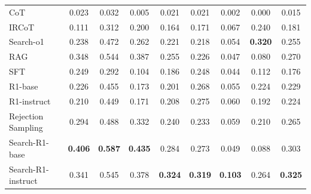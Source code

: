 \begin{table}[t]
\begin{tabular}{lcccccccc}
        CoT & 0.023 & 0.032 & 0.005 & 0.021 & 0.021 & 0.002 & 0.000 & 0.015 \\
        IRCoT & 0.111 & 0.312 & 0.200 & 0.164 & 0.171 & 0.067 & 0.240 & 0.181 \\
        Search-o1 & 0.238 & 0.472 & 0.262 & 0.221 & 0.218 & 0.054 & \textbf{0.320} & 0.255 \\
        RAG & 0.348 & 0.544 & 0.387 & 0.255 & 0.226 & 0.047 & 0.080 & 0.270  \\
        SFT & 0.249 & 0.292 & 0.104 & 0.186 & 0.248 & 0.044 & 0.112 & 0.176  \\
        R1-base & 0.226 & 0.455 & 0.173 & 0.201 & 0.268 & 0.055 & 0.224 & 0.229  \\
        R1-instruct & 0.210 & 0.449 & 0.171 & 0.208 & 0.275 & 0.060 & 0.192 & 0.224  \\
        Rejection Sampling & 0.294 & 0.488 & 0.332 & 0.240 & 0.233 & 0.059 & 0.210 & 0.265 \\
        \hdashline
        Search-R1-base & \textbf{0.406} & \textbf{0.587} & \textbf{0.435} & 0.284 & 0.273 & 0.049 & 0.088 & 0.303  \\
        Search-R1-instruct & 0.341 & 0.545 & 0.378 & \textbf{0.324} & \textbf{0.319} & \textbf{0.103} & 0.264 & \textbf{0.325}  \\
        \bottomrule
    \end{tabular}
\end{table}
